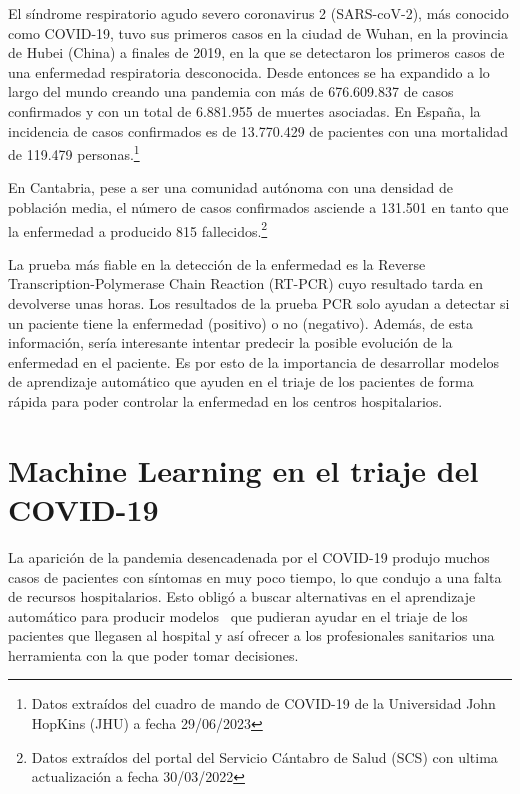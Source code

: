 
El síndrome respiratorio agudo severo coronavirus 2 (SARS-coV-2), más conocido como COVID-19, tuvo sus primeros casos en la ciudad de Wuhan, en la provincia de Hubei (China) a finales de 2019, en la que se detectaron los primeros casos de una enfermedad respiratoria desconocida. Desde entonces se ha expandido a lo largo del mundo creando una pandemia con más de 676.609.837 de casos confirmados y con un total de 6.881.955 de muertes asociadas. En España, la incidencia de casos confirmados es de 13.770.429 de pacientes con una mortalidad de 119.479 personas.\footnote{Datos extraídos del cuadro de mando de COVID-19 de la Universidad John HopKins (JHU) a fecha 29/06/2023}


En Cantabria, pese a ser una comunidad autónoma con una densidad de población media, el número de casos confirmados asciende a 131.501 en tanto que la enfermedad a producido 815 fallecidos.\footnote{Datos extraídos del portal del Servicio Cántabro de Salud (SCS) con ultima actualización a fecha 30/03/2022} 

La prueba más fiable en la detección de la enfermedad es la Reverse Transcription-Polymerase Chain Reaction (RT-PCR) cuyo resultado tarda en devolverse unas horas. Los resultados de la prueba PCR solo ayudan a detectar si un paciente tiene la enfermedad (positivo) o no (negativo).  Además, de esta información, sería interesante intentar predecir la posible evolución de la enfermedad en el paciente. Es por esto de la importancia de desarrollar modelos de aprendizaje automático que ayuden en el triaje de los pacientes de forma rápida para poder controlar la enfermedad en los centros hospitalarios.

\section{Machine Learning en el triaje del COVID-19}

La aparición de la pandemia desencadenada por el COVID-19 produjo muchos casos de pacientes con síntomas en muy poco tiempo, lo que condujo a una falta de recursos hospitalarios. Esto obligó a buscar alternativas en el aprendizaje automático para producir modelos~\cite{patel:2021}\cite{zhao:2020}\cite{kar:2021}\cite{subudhi:2021}\cite{kurstjens:2021} que pudieran ayudar en el triaje de los pacientes que llegasen al hospital y así ofrecer a los profesionales sanitarios una herramienta con la que poder tomar decisiones.


